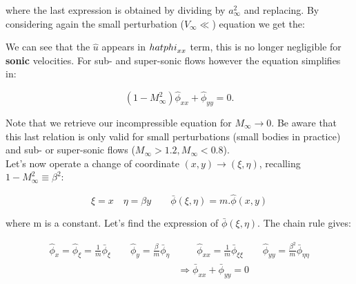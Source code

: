 	where the last expression is obtained by dividing by $a^2_\infty$ and replacing. By considering again the small perturbation ($V_\infty \ll$) equation we get the:
	
	\begin{center}
	\end{center}
	
	We can see that the $\hat{u}$ appears in $\\hat{phi} _{xx}$ term, this is no longer negligible for \textbf{sonic} velocities. For sub- and super-sonic flows however the equation simplifies in: 
	
	\begin{equation}
	(1-M_\infty ^2) \hat{\phi} _{xx} + \hat{\phi} _{yy} = 0.
	\end{equation}
	
	Note that we retrieve our incompressible equation for $M_\infty \rightarrow 0$. Be aware that this last relation is only valid for small perturbations (small bodies in practice) and sub- or super-sonic flows ($M_\infty > 1.2, M_\infty < 0.8$). \\
	
	Let's now operate a change of coordinate $(x,y) \rightarrow (\xi , \eta)$, recalling $1-M_\infty ^2 \equiv \beta ^2$: 
	
	\begin{equation}
	\xi = x \quad \eta = \beta y \qquad \bar{\phi} (\xi , \eta) = m .\hat{\phi}(x,y)
	\end{equation}
	
	where m is a constant. Let's find the expression of $\bar{\phi} (\xi, \eta)$. The chain rule gives: 
	
	\begin{equation}
	\begin{aligned}
	\hat{\phi} _x = \hat{\phi}_\xi = \frac{1}{m} \bar{\phi} _\xi \qquad  \hat{\phi} _y = \frac{\beta}{m} \bar{\phi}_\eta &\qquad \hat{\phi} _{xx} = \frac{1}{m} \bar{\phi}_{\xi \xi} \qquad \hat{\phi} _{yy} = \frac{\beta ^2}{m} \bar{\phi}_{\eta \eta}\\
	&\Rightarrow \bar{\phi}_{xx} + \bar{\phi}_{yy} = 0
	\end{aligned}
	\label{eq:6.14}
	\end{equation}
	
